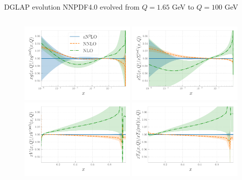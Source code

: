 \documentclass[aspectratio=169, 9pt,t]{beamer}
\begin{document}
\begin{frame}{DGLAP evolution}
  NNPDF4.0 evolved from $Q=1.65$ GeV to $Q=100$ GeV

  \begin{columns}
    \begin{column}{0.59\textwidth}
      \begin{figure}[!t]
        \centering
        \includegraphics[width=0.49\textwidth]{figures/N3LOevolution-q100gev-ratios_expanded_0.pdf}
        \includegraphics[width=0.49\textwidth]{figures/N3LOevolution-q100gev-ratios_expanded_1.pdf}\\
        \includegraphics[width=0.49\textwidth]{figures/N3LOevolution-q100gev-ratios_expanded_2.pdf}
        \includegraphics[width=0.49\textwidth]{figures/N3LOevolution-q100gev-ratios_expanded_3.pdf}

\end{figure}
\end{column}
\end{columns}
\end{frame}
\end{document}
